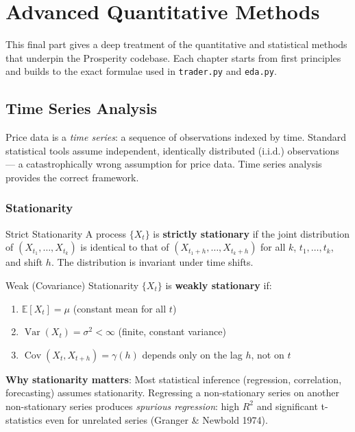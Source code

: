 \documentclass[12pt,a4paper,openany]{report}
\theoremstyle{definition}
\newcommand{\E}{\mathbb{E}}
\newcommand{\Var}{\operatorname{Var}}
\newcommand{\Cov}{\operatorname{Cov}}
\begin{document}
\part{Advanced Quantitative Methods}

This final part gives a deep treatment of the quantitative and statistical methods that underpin the Prosperity codebase. Each chapter starts from first principles and builds to the exact formulae used in \texttt{trader.py} and \texttt{eda.py}.

\chapter{Time Series Analysis}

Price data is a \emph{time series}: a sequence of observations indexed by time. Standard statistical tools assume independent, identically distributed (i.i.d.) observations — a catastrophically wrong assumption for price data. Time series analysis provides the correct framework.

\section{Stationarity}

\begin{definitionbox}{Strict Stationarity}
A process $\{X_t\}$ is \textbf{strictly stationary} if the joint distribution of $(X_{t_1}, \ldots, X_{t_k})$ is identical to that of $(X_{t_1+h}, \ldots, X_{t_k+h})$ for all $k$, $t_1,\ldots,t_k$, and shift $h$. The distribution is invariant under time shifts.
\end{definitionbox}

\begin{definitionbox}{Weak (Covariance) Stationarity}
$\{X_t\}$ is \textbf{weakly stationary} if:
\begin{enumerate}[label=\arabic*.]
  \item $\E[X_t] = \mu$ (constant mean for all $t$)
  \item $\Var(X_t) = \sigma^2 < \infty$ (finite, constant variance)
  \item $\Cov(X_t, X_{t+h}) = \gamma(h)$ depends only on the lag $h$, not on $t$
\end{enumerate}
\end{definitionbox}

\textbf{Why stationarity matters}: Most statistical inference (regression, correlation, forecasting) assumes stationarity. Regressing a non-stationary series on another non-stationary series produces \emph{spurious regression}: high $R^2$ and significant t-statistics even for unrelated series (Granger \& Newbold 1974).
\end{document}
